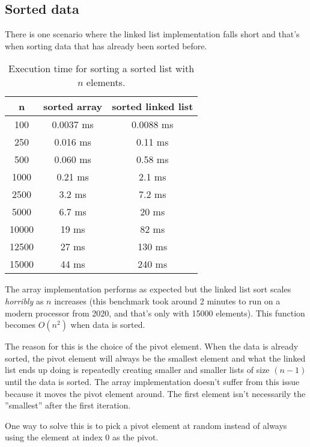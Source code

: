 \documentclass[a4paper,11pt]{article}
\begin{document}
\subsection*{Sorted data}

There is one scenario where the linked list implementation falls short and that's when sorting data that has already been sorted before.

\begin{table}[H]
\centering
\begin{tabular}{|c|c|c|}
\hline
\textbf{n} & \textbf{sorted array} & \textbf{sorted linked list} \\
\hline
	100 & 0.0037 ms & 0.0088 ms  \\
	250 & 0.016 ms & 0.11 ms  \\
	500 & 0.060 ms & 0.58 ms  \\
	1000 & 0.21 ms & 2.1 ms  \\
	2500 & 3.2 ms & 7.2 ms  \\
	5000 & 6.7 ms & 20 ms  \\
	10000 & 19 ms & 82 ms  \\
	12500 & 27 ms & 130 ms  \\
	15000 & 44 ms & 240 ms  \\
\hline
\end{tabular}
\caption{Execution time for sorting a sorted list with $n$ elements.}
\label{tab:table2}
\end{table}

\begin{table}[H]
\centering
{}
\end{table}

The array implementation performs as expected but the linked list sort scales \emph{horribly} as $n$ increases (this benchmark took around 2 minutes to run on a modern processor from 2020, and that's only with 15000 elements).
This function becomes $O(n^2)$ when data is sorted.

The reason for this is the choice of the pivot element.
When the data is already sorted,
the pivot element will always be the smallest element and what the linked list ends up doing is repeatedly creating smaller and smaller lists of size $(n - 1)$ until the data is sorted.
The array implementation doesn't suffer from this issue because it moves the pivot element around. The first element isn't necessarily the ''smallest'' after the first iteration.

One way to solve this is to pick a pivot element at random instead of always using the element at index $0$ as the pivot.
\end{document}

